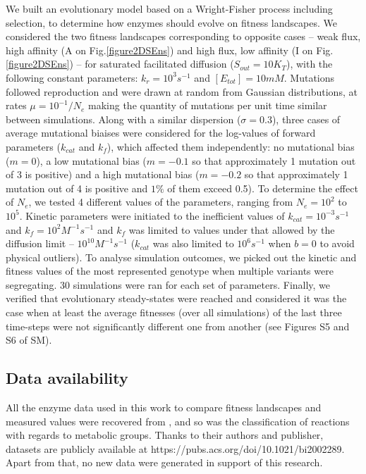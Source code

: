 \documentclass[11pt,onecolumn]{article}
\begin{document}
We built an evolutionary model based on a Wright-Fisher process including selection, to determine how enzymes should evolve on fitness landscapes. We considered the two fitness landscapes corresponding to opposite cases -- weak flux, high affinity (A on Fig.\ref{figure2DSEns}) and high flux, low affinity (I on Fig.\ref{figure2DSEns}) -- for saturated facilitated diffusion ($S_{out}=10K_T$), with the following constant parameters: $k_r=10^3s^{-1}$ and $[E_{tot}]=10mM$. Mutations followed reproduction and were drawn at random from Gaussian distributions, at rates $\mu=10^{-1}/N_e$ making the quantity of mutations per unit time similar between simulations. Along with a similar dispersion ($\sigma=0.3$), three cases of average mutational biaises were considered for the log-values of forward parameters ($k_{cat}$ and $k_f$), which affected them independently: no mutational bias ($m=0$), a low mutational bias ($m=-0.1$ so that approximately 1 mutation out of 3 is positive) and a high mutational bias ($m=-0.2$ so that approximately 1 mutation out of 4 is positive and $1\%$ of them exceed 0.5). To determine the effect of $N_e$, we tested 4 different values of the parameters, ranging from $N_e=10^2$ to $10^5$. Kinetic parameters were initiated to the inefficient values of $k_{cat}=10^{-3}s^{-1}$ and $k_f=10^2M^{-1}s^{-1}$ and $k_f$ was limited to values under that allowed by the diffusion limit -- $10^{10}M^{-1}s^{-1}$ ($k_{cat}$ was also limited to $10^{6}s^{-1}$ when $b=0$ to avoid physical outliers). To analyse simulation outcomes, we picked out the kinetic and fitness values of the most represented genotype when multiple variants were segregating. 30 simulations were ran for each set of parameters. Finally, we verified that evolutionary steady-states were reached and considered it was the case when at least the average fitnesses (over all simulations) of the last three time-steps were not significantly different one from another (see Figures S5 and S6 of SM).

\subsection{Data availability}

All the enzyme data used in this work to compare fitness landscapes and measured values were recovered from \citep{Bar-Even11}, and so was the classification of reactions with regards to metabolic groups. Thanks to their authors and publisher, datasets are publicly available at https://pubs.acs.org/doi/10.1021/bi2002289. Apart from that, no new data were generated in support of this research.
\end{document}
